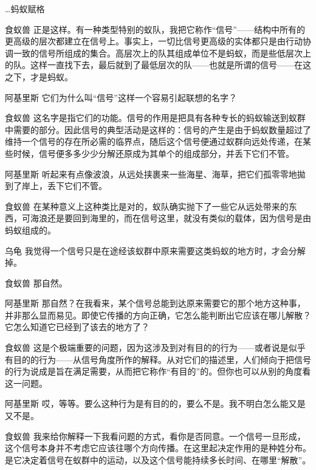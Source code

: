 \begin{dialog}{…蚂蚁赋格}
\begin{dialogue}
\item[食蚁兽]正是这样。有一种类型特别的蚁队，我把它称作“信号”——结构中所有的更高级的层次都建立在信号上。事实上，一切比信号更高级的实体都只是由行动协调一致的信号所组成的集合。高层次上的队其组成单位不是蚂蚁，而是些低层次上的队。这样一直找下去，最后就到了最低层次的队——也就是所谓的信号——在这之下，才是蚂蚁。

\item[阿基里斯]它们为什么叫“信号”这样一个容易引起联想的名字？

\item[食蚁兽]这名字是指它们的功能。信号的作用是把具有各种专长的蚂蚁输送到蚁群中需要的部分。因此信号的典型活动是这样的：信号的产生是由于蚂蚁数量超过了维持一个信号的存在所必需的临界点，随后这个信号便通过蚁群向远处传递，在某些时候，信号便多多少少分解还原成为其单个的组成部分，并丢下它们不管。

\item[阿基里斯]听起来有点像波浪，从远处挟裹来一些海星、海草，把它们孤零零地拋到了岸上，丢下它们不管。

\item[食蚁兽]在某种意义上这种类比是对的，蚁队确实抛下了一些它从远处带来的东西，可海浪还是要回到海里的，而在信号这里，就没有类似的载体，因为信号是由蚂蚁组成的。

\item[乌龟]我觉得一个信号只是在途经该蚁群中原来需要这类蚂蚁的地方时，才会分解掉。

\item[食蚁兽]那自然。

\item[阿基里斯]那自然？在我看来，某个信号总能到达原来需要它的那个地方这种事，并非那么显而易见。即使它传播的方向正确，它怎么能判断出它应该在哪儿解散？它怎么知道它已经到了该去的地方了？

\item[食蚁兽]这是个极端重要的问题，因为这涉及到对有目的的行为——或者说是似乎有目的的行为——从信号角度所作的解释。从对它们的描述里，人们倾向于把信号的行为说成是旨在满足需要，从而把它称作“有目的”的。但你也可以从别的角度看这一问题。

\item[阿基里斯]哎，等等。要么这种行为是有目的的，要么不是。我不明白怎么能又是又不是。

\item[食蚁兽]我来给你解释一下我看问题的方式，看你是否同意。一个信号一旦形成，这个信号本身并不考虑它应该往哪个方向传播。在这里起决定作用的是种姓分布。是它决定着信号在蚁群中的运动，以及这个信号能持续多长时间、在哪里“解散”。


\end{dialogue}
\end{dialog}
